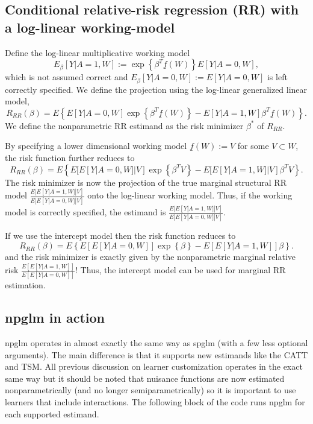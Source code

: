 \documentclass{article}
\begin{document}
\subsection{Conditional relative-risk regression (RR) with a log-linear working-model}
Define the log-linear multiplicative working model
$$E_{\beta}[Y|A=1,W] := \exp\left\{\beta^T \underline{f}(W) \right\}E[Y|A=0,W],$$
which is not assumed correct and $E_{\beta}[Y|A=0,W] := E[Y|A=0,W]$ is left correctly specified. We define the projection using the log-linear generalized linear model,
$$R_{RR}(\beta) = E \left\{E[Y|A=0,W] \exp\left\{ \beta^T \underline{f}(W)\right\}  -  E[Y|A=1,W]  \beta^T \underline{f}(W)\right\}.$$
We define the nonparametric RR estimand as the risk minimizer $\beta^*$ of $R_{RR}$. 

By specifying a lower dimensional working model $\underline{f}(W) := V$ for some $V \subset W$, the risk function further reduces to
$$R_{RR}(\beta) = E \left\{E[E[Y|A=0,W]|V] \exp\left\{ \beta^T V\right\}  -  E[E[Y|A=1,W]|V]  \beta^T V\right\}.$$
The risk minimizer is now the projection of the true marginal structural RR model $\frac{E[E[Y|A=1,W]|V]}{E[E[Y|A=0,W]|V]}$ onto the log-linear working model. Thus, if the working model is correctly specified, the estimand is $\frac{E[E[Y|A=1,W]|V]}{E[E[Y|A=0,W]|V]}$.


If we use the intercept model then the risk function reduces to
$$R_{RR}(\beta) = E \left\{E[E[Y|A=0,W]] \exp\left\{ \beta \right\}  -  E[E[Y|A=1,W]]  \beta\right\}.$$
and the risk minimizer is exactly given by the nonparametric marginal relative risk $\frac{E[E[Y|A=1,W]]}{E[E[Y|A=0,W]]}$! Thus, the intercept model can be used for marginal RR estimation.


\subsection{npglm in action}
npglm operates in almost exactly the same way as spglm (with a few less optional arguments). The main difference is that it supports new estimands like the CATT and TSM. All previous discussion on learner customization operates in the exact same way but it should be noted that nuisance functions are now estimated nonparametrically (and no longer semiparametrically) so it is important to use learners that include interactions. The following block of the code runs npglm for each supported estimand.
\end{document}
